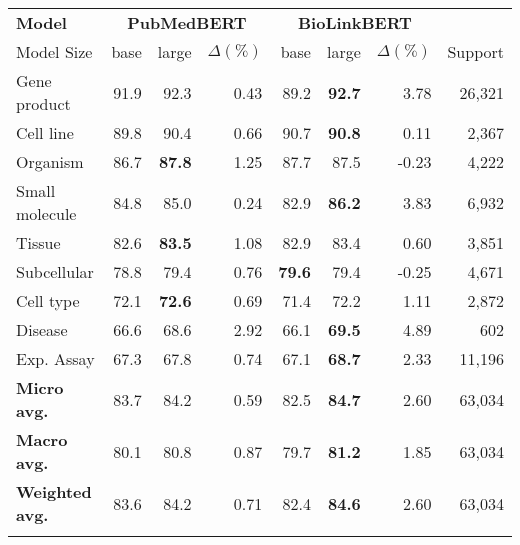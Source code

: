 \documentclass{bioinfo}
\begin{document}
\begin{table}[]
 {
\begin{tabular}{@{}l|rrr|rrr|r@{}}\toprule
\textbf{Model} & \multicolumn{3}{c|}{\textbf{PubMedBERT}} & \multicolumn{3}{c|}{\textbf{BioLinkBERT}} & \multicolumn{1}{c}{}        \\
Model Size     & base     & large     & $\Delta (\%)$     & base     & large     & $\Delta (\%)$     & \multicolumn{1}{r}{Support} \\\midrule
Gene product           & 91.9 & 92.3          & 0.43 & 89.2          & \textbf{92.7} & 3.78  & 26,321 \\
Cell line              & 89.8 & 90.4          & 0.66 & 90.7          & \textbf{90.8} & 0.11  & 2,367  \\
Organism               & 86.7 & \textbf{87.8} & 1.25 & 87.7          & 87.5          & -0.23 & 4,222  \\
Small molecule         & 84.8 & 85.0          & 0.24 & 82.9          & \textbf{86.2} & 3.83  & 6,932  \\
Tissue                 & 82.6 & \textbf{83.5} & 1.08 & 82.9          & 83.4          & 0.60  & 3,851  \\
Subcellular            & 78.8 & 79.4          & 0.76 & \textbf{79.6} & 79.4          & -0.25 & 4,671  \\
Cell type              & 72.1 & \textbf{72.6} & 0.69 & 71.4          & 72.2          & 1.11  & 2,872  \\
Disease                & 66.6 & 68.6          & 2.92 & 66.1          & \textbf{69.5} & 4.89  & 602     \\
Exp. Assay             & 67.3 & 67.8          & 0.74 & 67.1          & \textbf{68.7} & 2.33  & 11,196 \\\midrule
\textbf{Micro avg.}    & 83.7 & 84.2          & 0.59 & 82.5          & \textbf{84.7} & 2.60  & 63,034 \\ 
\textbf{Macro avg.}    & 80.1 & 80.8          & 0.87 & 79.7          & \textbf{81.2} & 1.85  & 63,034 \\
\textbf{Weighted avg.} & 83.6 & 84.2          & 0.71 & 82.4          & \textbf{84.6} & 2.60  & 63,034  \\\botrule
\end{tabular}
}{}
\end{table}
\end{document}
